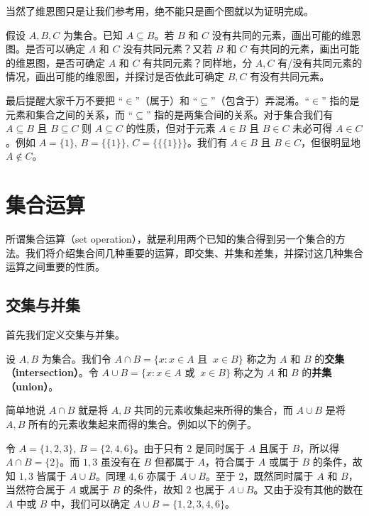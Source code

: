 当然了维恩图只是让我们参考用，绝不能只是画个图就以为证明完成。

\begin{question}
假设 $A, B, C$ 为集合。已知 $A \subseteq B$。若 $B$ 和 $C$ 没有共同的元素，画出可能的维恩图。是否可以确定 $A$ 和 $C$ 没有共同元素？又若 $B$ 和 $C$ 有共同的元素，画出可能的维恩图，是否可确定 $A$ 和 $C$ 有共同元素？同样地，分 $A, C$ 有/没有共同元素的情况，画出可能的维恩图，并探讨是否依此可确定 $B, C$ 有没有共同元素。
\end{question}

最后提醒大家千万不要把 “$\in$”（属于）和 “$\subseteq$”（包含于）弄混淆。“$\in$” 指的是元素和集合之间的关系，而 “$\subseteq$” 指的是两集合间的关系。对于集合我们有 $A \subseteq B$ 且 $B \subseteq C$ 则 $A \subseteq C$ 的性质，但对于元素 $A \in B$ 且 $B \in C$ 未必可得 $A \in C$。例如 $A = \{1\}$, $B = \{\{1\}\}$, $C = \{\{\{1\}\}\}$。我们有 $A \in B$ 且 $B \in C$，但很明显地 $A \notin C$。

\section{集合运算}

所谓集合运算（set operation），就是利用两个已知的集合得到另一个集合的方法。我们将介绍集合间几种重要的运算，即交集、并集和差集，并探讨这几种集合运算之间重要的性质。

\subsection{交集与并集}

首先我们定义交集与并集。

\begin{definition}
设 $A, B$ 为集合。我们令 $A \cap B = \{x : x \in A \text{ 且 }~ x \in B\}$ 称之为 $A$ 和 $B$ 的{\bf 交集（intersection）}。令 $A \cup B = \{x : x \in A \text{ 或 }~ x \in B\}$ 称之为 $A$ 和 $B$ 的{\bf 并集（union）}。
\end{definition}

简单地说 $A \cap B$ 就是将 $A, B$ 共同的元素收集起来所得的集合，而 $A \cup B$ 是将 $A, B$ 所有的元素收集起来而得的集合。例如以下的例子。

\begin{example}
令 $A = \{1, 2, 3\}$, $B = \{2, 4, 6\}$。由于只有 $2$ 是同时属于 $A$ 且属于 $B$，所以得 $A \cap B = \{2\}$。而 $1, 3$ 虽没有在 $B$ 但都属于 $A$，符合属于 $A$ 或属于 $B$ 的条件，故知 $1, 3$ 皆属于 $A \cup B$。同理 $4, 6$ 亦属于 $A \cup B$。至于 $2$，既然同时属于 $A$ 和 $B$，当然符合属于 $A$ 或属于 $B$ 的条件，故知 $2$ 也属于 $A \cup B$。又由于没有其他的数在 $A$ 中或 $B$ 中，我们可以确定 $A \cup B = \{1, 2, 3, 4, 6\}$。
\end{example}

